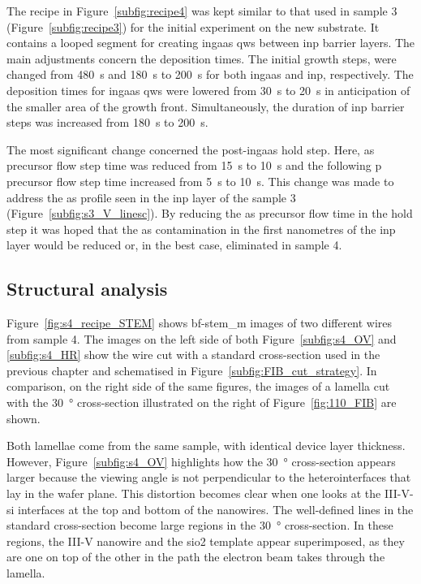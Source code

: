 The recipe in Figure~\ref{subfig:recipe4} was kept similar to that used in sample 3 (Figure~\ref{subfig:recipe3}) for the initial experiment on the new  substrate. It contains a looped segment for creating \acs{ingaas} \acl{qw}s between \acs{inp} barrier layers. The main adjustments concern the deposition times. The initial growth steps, were changed from \qty{480}{\second} and \qty{180}{\second} to \qty{200}{\second} for both \acs{ingaas} and \acs{inp}, respectively. The deposition times for \acs{ingaas} \acl{qw}s were lowered from \qty{30}{\second} to \qty{20}{\second} in anticipation of the smaller area of the growth front. Simultaneously, the duration of \acs{inp} barrier steps was increased from \qty{180}{\second} to \qty{200}{\second}.

The most significant change concerned the post-\acs{ingaas} hold step. Here, \acs{as} precursor flow step time was reduced from \qty{15}{s} to \qty{10}{s} and the following \acs{p} precursor flow step time increased from \qty{5}{s} to \qty{10}{s}. This change was made to address the \acs{as} profile seen in the \acs{inp} layer of the sample 3 (Figure~\ref{subfig:s3_V_linesc}). By reducing the \acs{as} precursor flow time in the hold step it was hoped that the \acs{as} contamination in the first nanometres of the \acs{inp} layer would be reduced or, in the best case, eliminated in sample 4.

\subsection{Structural analysis}

Figure~\ref{fig:s4_recipe_STEM} shows \acs{bf}-\acs{stem_m} images of two different wires from sample 4. The images on the left side of both Figure~\ref{subfig:s4_OV} and \ref{subfig:s4_HR} show the wire cut with a standard cross-section used in the previous chapter and schematised in Figure~\ref{subfig:FIB_cut_strategy}. In comparison, on the right side of the same figures, the images of a lamella cut with the \qty{30}{\degree} cross-section illustrated on the right of Figure~\ref{fig:110_FIB} are shown. 

Both lamellae come from the same sample, with identical device layer thickness. 
However, Figure~\ref{subfig:s4_OV} highlights how the \qty{30}{\degree} cross-section appears larger because the viewing angle is not perpendicular to the heterointerfaces that lay in the wafer plane. This distortion becomes clear when one looks at the III-V-\acs{si} interfaces at the top and bottom of the nanowires. The well-defined lines in the standard cross-section become large regions in the \qty{30}{\degree} cross-section. In these regions, the III-V nanowire and the \acs{sio2} template appear superimposed, as they are one on top of the other in the path the electron beam takes through the lamella.

